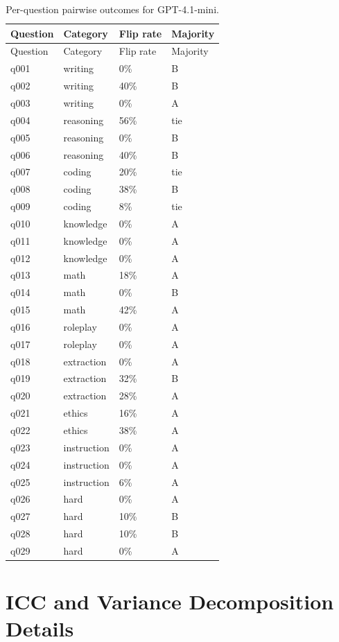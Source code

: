 \documentclass{ijclclp}
\begin{document}
\begin{longtable}{llll}
\caption{Per-question pairwise outcomes for GPT-4.1-mini.}\label{tab:perq_41mini}\\
\toprule
Question & Category & Flip rate & Majority \\
\midrule
\endfirsthead
\toprule
Question & Category & Flip rate & Majority \\
\midrule
\endhead
q001 & writing & 0\% & B \\
q002 & writing & 40\% & B \\
q003 & writing & 0\% & A \\
q004 & reasoning & 56\% & tie \\
q005 & reasoning & 0\% & B \\
q006 & reasoning & 40\% & B \\
q007 & coding & 20\% & tie \\
q008 & coding & 38\% & B \\
q009 & coding & 8\% & tie \\
q010 & knowledge & 0\% & A \\
q011 & knowledge & 0\% & A \\
q012 & knowledge & 0\% & A \\
q013 & math & 18\% & A \\
q014 & math & 0\% & B \\
q015 & math & 42\% & A \\
q016 & roleplay & 0\% & A \\
q017 & roleplay & 0\% & A \\
q018 & extraction & 0\% & A \\
q019 & extraction & 32\% & B \\
q020 & extraction & 28\% & A \\
q021 & ethics & 16\% & A \\
q022 & ethics & 38\% & A \\
q023 & instruction & 0\% & A \\
q024 & instruction & 0\% & A \\
q025 & instruction & 6\% & A \\
q026 & hard & 0\% & A \\
q027 & hard & 10\% & B \\
q028 & hard & 10\% & B \\
q029 & hard & 0\% & A \\
\bottomrule
\end{longtable}

\section{ICC and Variance Decomposition Details}
\end{document}
